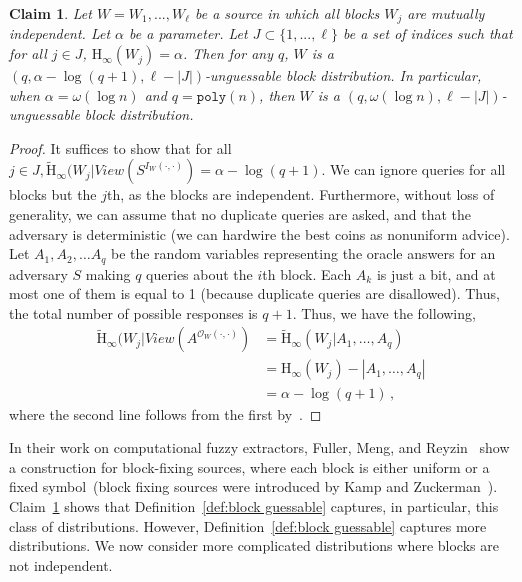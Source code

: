 \documentclass[11pt]{article}
\newcommand{\defref}[1]{\mbox{Definition~\ref{#1}}}
\newcommand{\clref}[1]{\mbox{Claim~\ref{#1}}}
\newcommand{\poly}{\ensuremath{\mathtt{poly}}\xspace}
\newcommand{\Hoo}{\mathrm{H}_\infty}
\newcommand{\Hav}{\tilde{\mathrm{H}}_\infty}
\newtheorem{claim}[theorem]{Claim}
\begin{document}
\begin{claim}
\label{cl:independent high ent}
Let $W = W_1,  ... , W_\ell$ be a source in which all blocks $W_j$  are mutually independent.  Let $\alpha$ be a parameter.  Let $J\subset \{1,..., \ell\}$ be a set of indices such that for all $j\in J$, $\Hoo(W_j ) =\alpha $.  Then for any $q$, $W$ is a $(q, \alpha - \log (q+1), \ell - |J|)$-unguessable block distribution.  In particular, when $\alpha = \omega(\log n)$ and $q = \poly(n)$, then $W$ is a $(q, \omega(\log n), \ell - |J|)$-unguessable block distribution.
\end{claim}
\begin{proof}
It suffices to show that for all $j\in J, \Hav(W_j |View(S^{I_{W}(\cdot, \cdot)}) = \alpha -\log (q+1)$.
We can ignore queries for all blocks but the $j$th, as the blocks are independent. Furthermore, without loss of generality, we can assume that no duplicate queries are asked, and that the adversary is deterministic (we can hardwire the best coins as nonuniform advice). Let $A_1, A_2, \dots A_q$ be the random variables representing the oracle answers for an  adversary $S$ making $q$  queries about the $i$th block. Each $A_k$ is just a bit, and at most one of them  is equal to 1 (because duplicate queries are disallowed). Thus, the total number of possible responses is $q+1$. Thus, we have the following,
\begin{align*}
\Hav(W_j | View(A^{\mathcal{O}_{W}(\cdot, \cdot)}) &= \Hav(W_j| A_1, \dots, A_q)\\
&=\Hoo(W_j) - |A_1, \dots, A_q|\\
&=\alpha - \log (q+1)\,,
\end{align*}
where the second line follows from the first by~\cite[Lemma 2.2]{DBLP:journals/siamcomp/DodisORS08}.
\end{proof}
\noindent In their work on computational fuzzy extractors, Fuller, Meng, and Reyzin~\cite{fuller2013computational} show a construction for block-fixing sources, where each block is either uniform or a fixed symbol~(block fixing sources were introduced by Kamp and Zuckerman~\cite{KZ07}).  \clref{cl:independent high ent} shows that \defref{def:block guessable} captures, in particular, this class of distributions.
However, \defref{def:block guessable} captures more distributions.  We now consider more complicated distributions where blocks are not independent.
\end{document}
